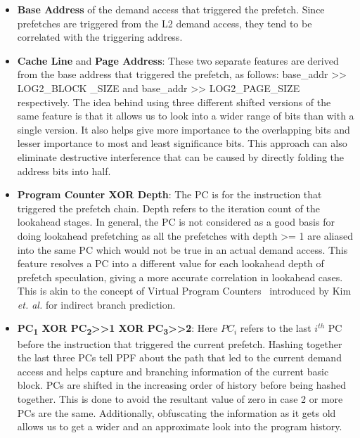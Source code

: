 \begin{itemize}
\item \textbf{Base Address} of the demand access that triggered the
  prefetch.  Since prefetches are triggered from the L2 demand access,
  they tend to be correlated with the triggering address.

\item \textbf{Cache Line} and \textbf{Page Address}: These two
  separate features are derived from the base address that triggered
  the prefetch, as follows: base\_addr >> LOG2\_BLOCK \_SIZE and
  base\_addr >> LOG2\_PAGE\_SIZE respectively.  The idea behind using
  three different shifted versions of the same feature is that it
  allows us to look into a wider range of bits than with a single
  version.  It also helps give more importance to the overlapping bits
  and lesser importance to most and least significance bits.  This
  approach can also eliminate destructive interference that can be
  caused by directly folding the address bits into half.


\item \textbf{Program Counter XOR Depth}: The PC is for the instruction
  that triggered the prefetch chain.  Depth refers to the iteration count of
  the lookahead stages.  In general, the PC is not considered as a good basis
  for doing lookahead prefetching as all the prefetches with depth >= 1 are
  aliased into the same PC which would not be true in an actual demand access.
  This feature resolves a PC into a different value for each lookahead depth
  of prefetch speculation, giving a more accurate correlation in lookahead
  cases.  This is akin to the concept of Virtual Program Counters~\cite{VPC}
  introduced by Kim \textit{et. al.} for indirect branch prediction.

\item \textbf{PC\textsubscript{1} XOR PC\textsubscript{2}>>1 XOR
  PC\textsubscript{3}>>2}: Here $PC_i$ refers to the last $i^{th}$
  PC before the instruction that triggered the current prefetch.
  Hashing together the last three PCs tell PPF about the path
  that led to the current demand access and helps capture and
  branching information of the current basic block.  PCs are shifted
  in the increasing order of history before being hashed together.
  This is done to avoid the resultant value of zero in case 2 or more
  PCs are the same.  Additionally, obfuscating the information as it
  gets old allows us to get a wider and an approximate look into the
  program history.


\end{itemize}
